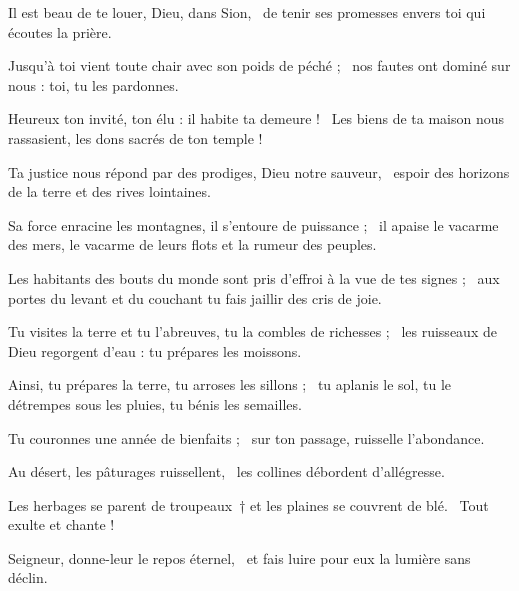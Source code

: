 \item Il est beau de te louer, Dieu, dans Sion,~\psstar{} de tenir ses promesses envers toi qui écoutes la prière.

\item Jusqu'à toi vient toute chair avec son poids de péché ;~\psstar{} nos fautes ont dominé sur nous : toi, tu les pardonnes.

\item Heureux ton invité, ton élu : il habite ta demeure !~\psstar{} Les biens de ta maison nous rassasient, les dons sacrés de ton temple !

\item Ta justice nous répond par des prodiges, Dieu notre sauveur,~\psstar{} espoir des horizons de la terre et des rives lointaines.

\item Sa force enracine les montagnes, il s'entoure de puissance ;~\psstar{} il apaise le vacarme des mers, le vacarme de leurs flots et la rumeur des peuples.

\item Les habitants des bouts du monde sont pris d'effroi à la vue de tes signes ;~\psstar{} aux portes du levant et du couchant tu fais jaillir des cris de joie.

\item Tu visites la terre et tu l'abreuves, tu la combles de richesses ;~\psstar{} les ruisseaux de Dieu regorgent d'eau : tu prépares les moissons. 

\item Ainsi, tu prépares la terre, tu arroses les sillons ;~\psstar{} tu aplanis le sol, tu le détrempes sous les pluies, tu bénis les semailles.

\item Tu couronnes une année de bienfaits ;~\psstar{} sur ton passage, ruisselle l'abondance.

\item Au désert, les pâturages ruissellent,~\psstar{} les collines débordent d'allégresse.

\item Les herbages se parent de troupeaux~† et les plaines se couvrent de blé.~\psstar{} Tout exulte et chante !

\item Seigneur, donne-leur le repos éternel,~\psstar{} et fais luire pour eux la lumière sans déclin.